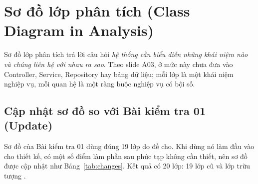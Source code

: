 \documentclass[12pt,a4paper]{article}
\begin{document}
\section{Sơ đồ lớp phân tích (Class Diagram in Analysis)}\label{sec:41}

Sơ đồ lớp phân tích trả lời câu hỏi \emph{hệ thống cần biểu diễn những khái niệm nào và chúng liên hệ
với nhau ra sao}. Theo slide A03, ở mức này chưa đưa vào Controller, Service, Repository hay bảng dữ
liệu; mỗi lớp là một khái niệm nghiệp vụ, mỗi quan hệ là một ràng buộc nghiệp vụ có bội số.

\subsection{Cập nhật sơ đồ so với Bài kiểm tra 01 (Update)}

Sơ đồ của Bài kiểm tra 01 dùng đúng 19 lớp do đề cho. Khi dùng nó làm đầu vào cho thiết kế, có một số
điểm làm phần sau phức tạp không cần thiết, nên sơ đồ được cập nhật như Bảng~\ref{tab:changes}. Kết quả
có 20 lớp: 19 lớp cũ và lớp trừu tượng .
\end{document}
